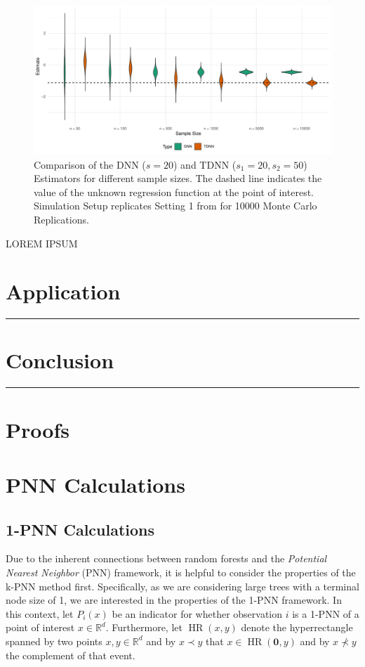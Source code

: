 \documentclass[letterpaper,10pt]{article}
\numberwithin{equation}{section}
\numberwithin{thm}{section}
\newcommand{\1}{\mathbb{1}}
\begin{document}
\begin{figure}[H]
	\includegraphics[width = \textwidth]{../Code/Simulations/Graphics/TDNN_DNN.pdf}
	\caption{Comparison of the DNN ($s = 20$) and TDNN ($s_1 = 20, s_2 = 50$) Estimators for different sample sizes.
		The dashed line indicates the value of the unknown regression function at the point of interest.
		Simulation Setup replicates Setting 1 from \citet{demirkaya_optimal_2024} for 10000 Monte Carlo Replications.}
\end{figure}

{\color{red} LOREM IPSUM}


\section{Application}\label{Application}
\hrule

\section{Conclusion}\label{Conclusion}
\hrule

\newpage
\printbibliography

\appendix
\section{Proofs}

\section{PNN Calculations}
\subsection{1-PNN Calculations}

Due to the inherent connections between random forests and the \textit{Potential Nearest Neighbor} (PNN) framework, it is helpful to consider the properties of the k-PNN method first.
Specifically, as we are considering large trees with a terminal node size of 1, we are interested in the properties of the 1-PNN framework.
In this context, let $P_i(x)$ be an indicator for whether observation $i$ is a 1-PNN of a point of interest $x \in \mathbb{R}^d$.
Furthermore, let $\operatorname{HR}(x,y)$ denote the hyperrectangle spanned by two points $x,y \in \mathbb{R}^d$ and by $x \prec y$ that $x \in \operatorname{HR}(\mathbf{0}, y)$ and by $x \not\prec y$ the complement of that event.
\end{document}

